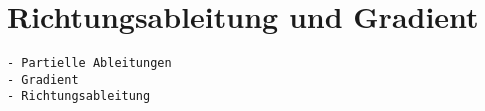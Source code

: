 %
%
%
\section{Richtungsableitung und Gradient
\label{buch:fuvar:section:richtungsableitung}}

\begin{verbatim}
- Partielle Ableitungen
- Gradient
- Richtungsableitung
\end{verbatim}

